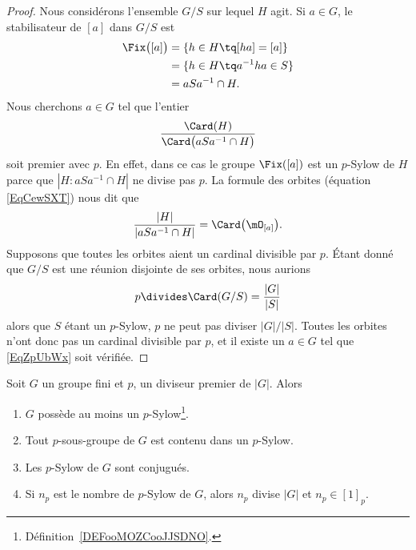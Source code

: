 \begin{proof}
	Nous considérons l'ensemble \( G/S\) sur lequel \( H\) agit. Si \( a\in G\), le stabilisateur de \( [a]\) dans \( G/S\) est
	\begin{subequations}
		\begin{align}
			\Fix\big( [a] \big) & =\{ h\in H\tq [ha]=[a] \}     \\
			                    & =\{ h\in H\tq a^{-1}ha\in S\} \\
			                    & =aSa^{-1}\cap H.
		\end{align}
	\end{subequations}
	Nous cherchons \( a\in G\) tel que l'entier
	\begin{equation}        \label{EqZpUbWx}
		\frac{ \Card(H) }{ \Card\big( aSa^{-1}\cap H \big) }
	\end{equation}
	soit premier avec \( p\). En effet, dans ce cas le groupe \( \Fix([a])\) est un \( p\)-Sylow de \( H\) parce que \( | H:aSa^{-1}\cap H |\) ne divise pas \( p\). La formule des orbites (équation \eqref{EqCewSXT}) nous dit que
	\begin{equation}
		\frac{ | H | }{ | aSa^{-1}\cap H | }=\Card\big( \mO_{[a]} \big).
	\end{equation}
	Supposons que toutes les orbites aient un cardinal divisible par \( p\). Étant donné que \( G/S\) est une réunion disjointe de ses orbites, nous aurions
	\begin{equation}
		p\divides \Card(G/S)=\frac{ | G | }{ | S | }
	\end{equation}
	alors que \( S\) étant un \( p\)-Sylow, \( p\) ne peut pas diviser \( | G |/| S |\). Toutes les orbites n'ont donc pas un cardinal divisible par \( p\), et il existe un \( a\in G\) tel que \eqref{EqZpUbWx} soit vérifiée.
\end{proof}


\begin{theorem}  \label{ThoUkPDXf}
	Soit \( G\) un groupe fini et \( p\), un diviseur premier de \( | G |\). Alors
	\begin{enumerate}
		\item       \label{ITEMooETYHooXlUMQZ}
		      \( G\) possède au moins un \( p\)-Sylow\footnote{Définition~\ref{DEFooMOZCooJJSDNO}.}.
		\item
		      Tout \( p\)-sous-groupe de \( G\) est contenu dans un \( p\)-Sylow.
		\item   \label{ItemMzNRVf}
		      Les \( p\)-Sylow de \( G\) sont conjugués.
		\item   \label{ItemkYbdzZ}
		      Si \( n_p\) est le nombre de \( p\)-Sylow de \( G\), alors \( n_p\) divise \( | G |\) et \( n_p\in[1]_p\).
	\end{enumerate}
\end{theorem}

